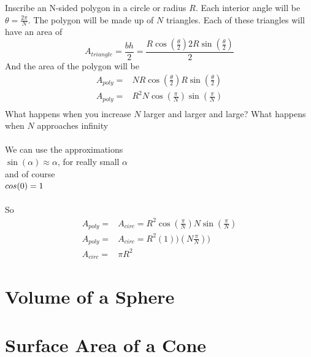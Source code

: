 Inscribe an N-sided polygon in a circle or radius \(R\).  Each interior angle will be \(\theta =\frac{2\pi}{N}\).  The polygon will be made up of \(N\) triangles.  Each of these triangles will have an area of
\[A_{triangle} = \frac{bh}{2} = \frac{R\cos(\frac{\theta}{2})2R\sin(\frac{\theta}{2})}{2}\]
And the area of the polygon will be
\begin{align*}
A_{poly} =& NR\cos(\frac{\theta}{2})R\sin(\frac{\theta}{2})\\
A_{poly} =& R^2N\cos(\frac{\pi}{N})\sin(\frac{\pi}{N})\\
\end{align*}
What happens when you increase \(N\) larger and larger and large?  What happens when \(N\) approaches infinity\\
\\
We can use the approximations\\
\(\sin(\alpha) \approx \alpha\), for really small \(\alpha\)\\
and of course\\
\(\\cos(0) = 1\)\\
\\
So
\begin{align*}
A_{poly} =& A_{circ} = R^2\cos(\frac{\pi}{N})N\sin(\frac{\pi}{N})\\
A_{poly} =& A_{circ} = R^2(1))(N\frac{\pi}{N}))\\
A_{circ} =& \pi R^2
\end{align*}

\section{Volume of a Sphere}

\section{Surface Area of a Cone}